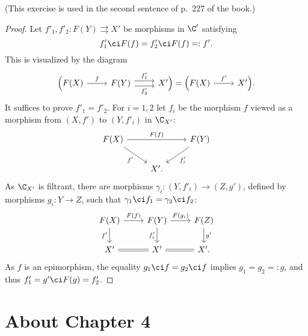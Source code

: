 \documentclass[12pt]{article}
\theoremstyle{remark}
\theoremstyle{definition}
\begin{document}
(This exercise is used in the second sentence of p.~227 of the book.)

\begin{proof}
Let $f'_1,f'_2:F(Y)\rightrightarrows X'$ be morphisms in $\C'$ satisfying 
$$
f'_1\ci F(f)=f'_2\ci F(f)=:f'.
$$
This is visualized by the diagram
$$
\begin{tikzcd}
\Big(F(X)\ar{r}{f}&F(Y)\ar[yshift=.7ex]{r}{f'_1}\ar[yshift=-.7ex]{r}[swap]{f'_2}&X'\Big)=\Big(F(X)\ar{r}{f'}&X'\Big).
\end{tikzcd}
$$ 
It suffices to prove $f'_1=f'_2$. For $i=1,2$ let $f_i$ be the morphism $f$ viewed as a morphism from $(X,f')$ to $(Y,f'_i)$ in $\C_{X'}$: 
$$
\begin{tikzcd}
F(X)\ar{dr}[swap]{f'}\ar{rr}{F(f)}&&F(Y)\ar{dl}{f'_i}\\ 
{}&X'.
\end{tikzcd}
$$
As $\C_{X'}$ is filtrant, there are morphisms $\gamma_i:(Y,f'_i)\to(Z,g')$, defined by morphisms $g_i:Y\to Z$, such that $\gamma_1\ci f_1=\gamma_2\ci f_2$:
$$
\begin{tikzcd}
F(X)\ar{d}[swap]{f'}\ar{r}{F(f)}&F(Y)\ar{d}[swap]{f'_i}\ar{r}{F(g_i)}&F(Z)\ar{d}{g'}\\ 
X'\ar[equal]{r}&X'\ar[equal]{r}&X'.
\end{tikzcd}
$$
As $f$ is an epimorphism, the equality $g_1\ci f=g_2\ci f$ implies $g_1=g_2=:g$, and thus $f'_1=g'\ci F(g)=f'_2$.
\end{proof}


\section{About Chapter 4}
\end{document}
